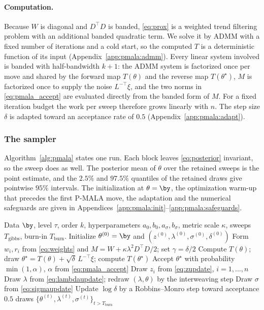 \paragraph{Computation.} Because $W$ is diagonal and $D^\top D$ is banded, \eqref{eq:prox} is a weighted trend filtering problem with an additional banded quadratic term. We solve it by ADMM with a fixed number of iterations and a cold start, so the computed $T$ is a deterministic function of its input (Appendix~\ref{app:pmala:admm}). Every linear system involved is banded with half-bandwidth $k+1$: the ADMM system is factorized once per move and shared by the forward map $T(\theta)$ and the reverse map $T(\theta^\star)$, $M$ is factorized once to supply the noise $L^{-\top}\xi$, and the two norms in \eqref{eq:pmala_accept} are evaluated directly from the banded form of $M$. For a fixed iteration budget the work per sweep therefore grows linearly with $n$. The step size $\delta$ is adapted toward an acceptance rate of $0.5$ (Appendix~\ref{app:pmala:adapt}).

\subsubsection{The sampler}

Algorithm~\ref{alg:pmala} states one run. Each block leaves \eqref{eq:posterior} invariant, so the sweep does as well. The posterior mean of $\theta$ over the retained sweeps is the point estimate, and the $2.5\%$ and $97.5\%$ quantiles of the retained draws give pointwise $95\%$ intervals. The initialization at $\theta = \by$, the optimization warm-up that precedes the first P-MALA move, the adaptation and the numerical safeguards are given in Appendices~\ref{app:pmala:init}--\ref{app:pmala:safeguards}.

\begin{algorithm}[h!]
\caption{Bayesian-PMALA for a single quantile level $\tau$}
\label{alg:pmala}
\begin{algorithmic}[1]
\Require Data $\by$, level $\tau$, order $k$, hyperparameters $a_0, b_0, a_\sigma, b_\sigma$, metric scale $\kappa$, sweeps $T_{\mathrm{gibbs}}$, burn-in $T_{\mathrm{burn}}$.
\State Initialize $\theta^{(0)} = \by$ and $(z^{(0)}, \lambda^{(0)}, \sigma^{(0)}, \delta^{(0)})$ 
    \State Form $w_i, r_i$ from \eqref{eq:weights} and $M = W + \kappa\lambda^2 D^\top D/2$; set $\gamma = \delta/2$
    \State Compute $T(\theta)$; draw $\theta^\star = T(\theta) + \sqrt{\delta}\,L^{-\top}\xi$; compute $T(\theta^\star)$ 
    \State Accept $\theta^\star$ with probability $\min(1,\alpha)$, $\alpha$ from \eqref{eq:pmala_accept}
    \State Draw $z_i$ from \eqref{eq:zupdate}, $i = 1, \ldots, n$
    \State Draw $\lambda$ from \eqref{eq:lambdaupdate}; redraw $(\lambda, \theta)$ by the interweaving step
    \State Draw $\sigma$ from \eqref{eq:sigmaupdate}
    \State Update $\log\delta$ by a Robbins--Monro step toward acceptance $0.5$
\EndFor
\State \Return draws $\{\theta^{(t)}, \lambda^{(t)}, \sigma^{(t)}\}_{t > T_{\mathrm{burn}}}$
\end{algorithmic}
\end{algorithm}

